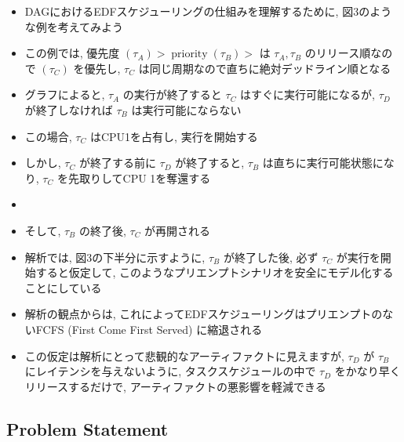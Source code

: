 \begin{frame}{}
    \begin{itemize}
        \item DAGにおけるEDFスケジューリングの仕組みを理解するために, 図3のような例を考えてみよう
        \item この例では, 優先度 $\left(\tau_{A}\right)>\operatorname{priority}\left(\tau_{B}\right)>$ は $\tau_{A}, \tau_{B}$ のリリース順なので $\left(\tau_{C}\right)$ を優先し, $\tau_{C}$ は同じ周期なので直ちに絶対デッドライン順となる
        \item グラフによると, $\tau_{A}$ の実行が終了すると $\tau_{C}$ はすぐに実行可能になるが, $\tau_{D}$ が終了しなければ $\tau_{B}$ は実行可能にならない
        \item この場合, $\tau_{C}$ はCPU1を占有し, 実行を開始する
        \item しかし, $\tau_{C}$ が終了する前に $\tau_{D}$ が終了すると, $\tau_{B}$ は直ちに実行可能状態になり, $\tau_{C}$ を先取りしてCPU 1を奪還する
    \end{itemize}
\end{frame}

\begin{frame}{}
    \begin{itemize}
        \item
        \item そして, $\tau_{B}$ の終了後, $\tau_{C}$ が再開される
        \item 解析では, 図3の下半分に示すように, $\tau_{B}$ が終了した後, 必ず $\tau_{C}$ が実行を開始すると仮定して, このようなプリエンプトシナリオを安全にモデル化することにしている
        \item 解析の観点からは, これによってEDFスケジューリングはプリエンプトのないFCFS (First Come First Served) に縮退される
        \item この仮定は解析にとって悲観的なアーティファクトに見えますが, $\tau_{D}$ が $\tau_{B}$ にレイテンシを与えないように, タスクスケジュールの中で $\tau_{D}$ をかなり早くリリースするだけで, アーティファクトの悪影響を軽減できる
    \end{itemize}
\end{frame}


\subsection{Problem Statement}
\label{ssec: problem statement}

